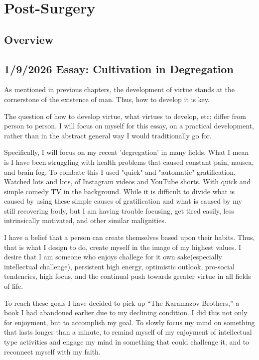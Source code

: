 \chapter{Post-Surgery}
\section{Overview}

\section{1/9/2026 Essay: Cultivation in Degregation}

As mentioned in previous chapters, the development of virtue stands at the cornerstone of the existence of man. Thus, how to develop it is key.

The question of how to develop virtue, what virtues to develop, etc; differ from person to person. I will focus on myself for this essay, on a practical development, rather than in the abstract general
way I would traditionally go for.

Specifically, I will focus on my recent 'degregation' in many fields. What I mean is I have been struggling with health problems that caused constant pain, nausea, and brain fog.
To combate this I used "quick" and "automatic" gratification. Watched lots and lots, of Instagram videos and YouTube shorts. With quick and simple comedy TV in the background.
While it is difficult to divide what is caused by using these simple causes of gratification and what is caused by my still recovering body, but I am having trouble focusing, get tired easily,
less intrinsically motivated, and other similar malignities.

I have a belief that a person can create themselves based upon their habits. Thus, that is what I design to do, create myself in the image of my highest
values. I desire that I am someone who enjoys challege for it own sake(especially intellectual challenge), persistent high energy, optimistic outlook,  pro-social tendencies,
high focus, and the continual push towards greater virtue in all fields of life.

To reach these goals I have decided to pick up “The Karamazov Brothers,” a book I had abandoned earlier due to my declining condition. I did this not only for enjoyment, but to accomplish my goal. To slowly focus my mind on something that lasts longer than a minute, to remind myself of my enjoyment of intellectual type activities and engage my mind in something that could challenge it, and to reconnect myself with my faith.

